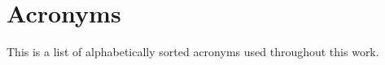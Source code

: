 \let\oldbaselinestretch=\baselinestretch%
\renewcommand{\baselinestretch}{1.15}%
\large\normalsize%

\chapter*{Acronyms}
\label{chapter:acronyms}

This is a list of alphabetically sorted acronyms used throughout this work.

\begin{acronym}[PAO]

  \setlength{\itemsep}{-\parsep}

\end{acronym}

\renewcommand{\baselinestretch}{\oldbaselinestretch}%
\large\normalsize%

\newcommand{\PAO}{\ac{PAO}\xspace}
\newcommand{\WCDs}{\acp{WCD}\xspace}
\newcommand{\WCD}{\ac{WCD}\xspace}
\newcommand{\SD}{\ac{SD}\xspace}
\newcommand{\FD}{\ac{FD}\xspace}
\newcommand{\CRs}{\acp{CR}\xspace}
\newcommand{\CR}{\ac{CR}\xspace}
\newcommand{\UHECRs}{\acp{UHECR}\xspace}
\newcommand{\UHECR}{\ac{UHECR}\xspace}
\newcommand{\DAQ}{\ac{DAQ}\xspace}